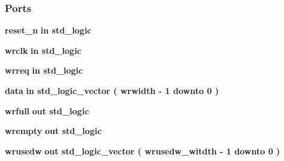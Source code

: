 \subsubsection*{Ports}
 \begin{DoxyCompactItemize}
\item 
{\bf reset\+\_\+n}  {\bfseries {\bfseries \textcolor{keywordflow}{in}\textcolor{vhdlchar}{ }}} {\bfseries \textcolor{comment}{std\+\_\+logic}\textcolor{vhdlchar}{ }} 
\item 
{\bf wrclk}  {\bfseries {\bfseries \textcolor{keywordflow}{in}\textcolor{vhdlchar}{ }}} {\bfseries \textcolor{comment}{std\+\_\+logic}\textcolor{vhdlchar}{ }} 
\item 
{\bf wrreq}  {\bfseries {\bfseries \textcolor{keywordflow}{in}\textcolor{vhdlchar}{ }}} {\bfseries \textcolor{comment}{std\+\_\+logic}\textcolor{vhdlchar}{ }} 
\item 
{\bf data}  {\bfseries {\bfseries \textcolor{keywordflow}{in}\textcolor{vhdlchar}{ }}} {\bfseries \textcolor{comment}{std\+\_\+logic\+\_\+vector}\textcolor{vhdlchar}{ }\textcolor{vhdlchar}{(}\textcolor{vhdlchar}{ }\textcolor{vhdlchar}{ }\textcolor{vhdlchar}{ }\textcolor{vhdlchar}{ }{\bfseries {\bf wrwidth}} \textcolor{vhdlchar}{-\/}\textcolor{vhdlchar}{ } \textcolor{vhdldigit}{1} \textcolor{vhdlchar}{ }\textcolor{keywordflow}{downto}\textcolor{vhdlchar}{ }\textcolor{vhdlchar}{ } \textcolor{vhdldigit}{0} \textcolor{vhdlchar}{ }\textcolor{vhdlchar}{)}\textcolor{vhdlchar}{ }} 
\item 
{\bf wrfull}  {\bfseries {\bfseries \textcolor{keywordflow}{out}\textcolor{vhdlchar}{ }}} {\bfseries \textcolor{comment}{std\+\_\+logic}\textcolor{vhdlchar}{ }} 
\item 
{\bf wrempty}  {\bfseries {\bfseries \textcolor{keywordflow}{out}\textcolor{vhdlchar}{ }}} {\bfseries \textcolor{comment}{std\+\_\+logic}\textcolor{vhdlchar}{ }} 
\item 
{\bf wrusedw}  {\bfseries {\bfseries \textcolor{keywordflow}{out}\textcolor{vhdlchar}{ }}} {\bfseries \textcolor{comment}{std\+\_\+logic\+\_\+vector}\textcolor{vhdlchar}{ }\textcolor{vhdlchar}{(}\textcolor{vhdlchar}{ }\textcolor{vhdlchar}{ }\textcolor{vhdlchar}{ }\textcolor{vhdlchar}{ }{\bfseries {\bf wrusedw\+\_\+witdth}} \textcolor{vhdlchar}{-\/}\textcolor{vhdlchar}{ } \textcolor{vhdldigit}{1} \textcolor{vhdlchar}{ }\textcolor{keywordflow}{downto}\textcolor{vhdlchar}{ }\textcolor{vhdlchar}{ } \textcolor{vhdldigit}{0} \textcolor{vhdlchar}{ }\textcolor{vhdlchar}{)}\textcolor{vhdlchar}{ }} 
\item 

\end{DoxyCompactItemize}
